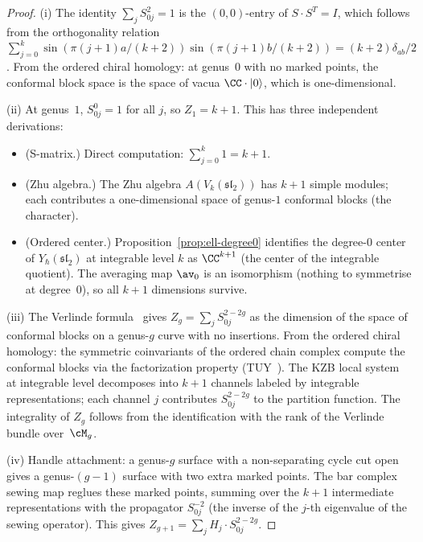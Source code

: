 \begin{proof}
\textup{(i)} The identity $\sum_j S_{0j}^2 = 1$ is the
$(0,0)$-entry of $S \cdot S^T = I$, which follows from the
orthogonality relation
$\sum_{j=0}^{k} \sin(\pi(j{+}1)a/(k{+}2))
\sin(\pi(j{+}1)b/(k{+}2)) = (k{+}2)\delta_{ab}/2$.
From the ordered chiral homology: at genus~$0$ with no
marked points, the conformal block space is the space of
vacua $\CC \cdot |0\rangle$, which is one-dimensional.

\textup{(ii)} At genus~$1$, $S_{0j}^0 = 1$ for all $j$,
so $Z_1 = k + 1$. This has three independent derivations:
\begin{itemize}
\item \textup{(S-matrix.)} Direct computation:
  $\sum_{j=0}^{k} 1 = k + 1$.
\item \textup{(Zhu algebra.)} The Zhu algebra
  $A(V_k(\mathfrak{sl}_2))$ has $k+1$ simple modules;
  each contributes a one-dimensional space of genus-$1$
  conformal blocks (the character).
\item \textup{(Ordered center.)}
  Proposition~\ref{prop:ell-degree0} identifies the
  degree-$0$ center of $Y_\hbar(\mathfrak{sl}_2)$ at
  integrable level $k$ as $\CC^{k+1}$ (the center of
  the integrable quotient). The averaging map $\av_0$ is
  an isomorphism (nothing to symmetrise at degree~$0$),
  so all $k+1$ dimensions survive.
\end{itemize}

\textup{(iii)} The Verlinde formula~\cite{Verlinde88} gives
$Z_g = \sum_j S_{0j}^{2-2g}$ as the dimension of the space
of conformal blocks on a genus-$g$ curve with no insertions.
From the ordered chiral homology: the symmetric coinvariants
of the ordered chain complex compute the conformal blocks
via the factorization property (TUY~\cite{TUY89}). The
KZB local system at integrable level decomposes into $k+1$
channels labeled by integrable representations; each channel
$j$ contributes $S_{0j}^{2-2g}$ to the partition function.
The integrality of $Z_g$ follows from the identification
with the rank of the Verlinde bundle over~$\cM_g$.

\textup{(iv)} Handle attachment: a genus-$g$ surface with
a non-separating cycle cut open gives a genus-$(g{-}1)$
surface with two extra marked points. The bar complex sewing
map reglues these marked points, summing over the $k+1$
intermediate representations with the propagator
$S_{0j}^{-2}$ (the inverse of the $j$-th eigenvalue of
the sewing operator). This gives
$Z_{g+1} = \sum_j H_j \cdot S_{0j}^{2-2g}$.


\end{proof}
